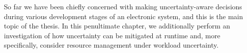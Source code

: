 So far we have been chiefly concerned with making uncertainty-aware decisions
during various development stages of an electronic system, and this is the main
topic of the thesis. In this penultimate chapter, we additionally perform an
investigation of how uncertainty can be mitigated at runtime and, more
specifically, consider resource management under workload uncertainty.

\section{\introductiontitle}

\section{\problemtitle}

\section{\priortitle}

\section{\solutiontitle}

\section{\resultstitle}

\section{\conclusiontitle}
